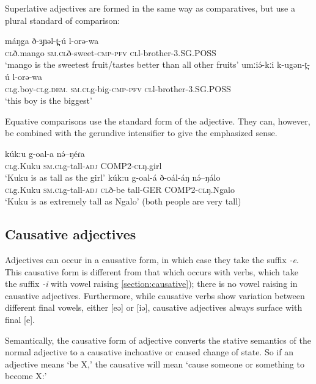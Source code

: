 Superlative adjectives are formed in the same way as comparatives, but use a plural standard of comparison:

\ea 
	\ea \gll máŋga 	ð-ɜɲəl-t̪-ú 			l-orə-wa	\\
		\textsc{cl}ð.mango 	\textsc{sm}.\textsc{cl}ð-sweet-\textsc{cmp}-\textsc{pfv}	\textsc{cl}l-brother-3.SG.POSS\\
		\glt ‘mango is the sweetest fruit/tastes better than all other fruits’
	\ex	\gll umːiə́-kːi 		k-ugən-t̪-ú 			l-orə-wa\\
		 	\textsc{cl}g.boy-\textsc{cl}g.\textsc{dem}.	\textsc{sm}.\textsc{cl}g-big-\textsc{cmp}-\textsc{pfv}	\textsc{cl}l-brother-3.SG.POSS\\
		\glt ‘this boy is the biggest’
\z \z 

Equative comparisons use the standard form of the adjective. They can, however, be combined with the gerundive intensifier to give the emphasized sense. 

\ea 
	\ea \gll kúk:u 	g-oal-a 		nə́--ŋéɾa \\
			\textsc{cl}g.Kuku	\textsc{sm}.\textsc{cl}g-tall-\textsc{adj}	COMP2-\textsc{cl}ŋ.girl	\\
		\glt ‘Kuku is as tall as the girl’
	\ex \gll kúk:u 	g-oal-á 	ð-oál-áŋ 	nə́--ŋálo	\\
			\textsc{cl}g.Kuku	\textsc{sm}.\textsc{cl}g-tall-\textsc{adj}	\textsc{cl}ð-be tall-GER	COMP2-\textsc{cl}ŋ.Ngalo	\\
		\glt ‘Kuku is as extremely tall as Ngalo’ (both people are very tall)
\z \z 


\subsection{Causative adjectives}\label{sec:ch10:causadj}

Adjectives can occur in a causative form, in which case they take the suffix \textit{-e}. This causative form is different from that which occurs with verbs, which take the suffix \textit{-i} with vowel raising \ref{section:causative}); there is no vowel raising in causative adjectives. Furthermore, while causative verbs show variation between different final vowels, either [eə] or [iə], causative adjectives always surface with final [e].

Semantically, the causative form of adjective converts the stative semantics of the normal adjective to a causative inchoative or caused change of state. So if an adjective means `be X,' the causative will mean `cause someone or something to become X:'

